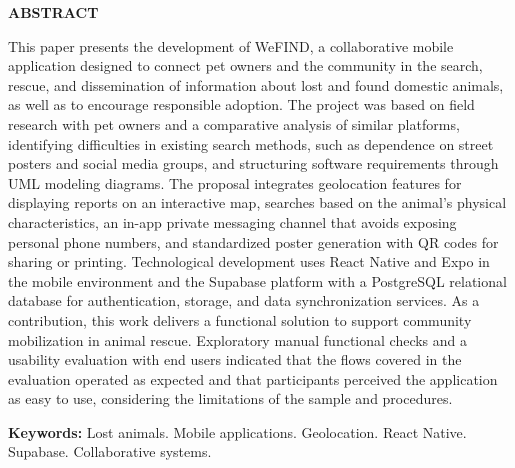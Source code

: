 \thispagestyle{empty}

\begin{center}
    \textbf{\large ABSTRACT}
\end{center}

\vspace{14pt}

\begin{singlespace}
\noindent\justifying
This paper presents the development of WeFIND, a collaborative mobile application designed to connect pet owners and the community in the search, rescue, and dissemination of information about lost and found domestic animals, as well as to encourage responsible adoption. The project was based on field research with pet owners and a comparative analysis of similar platforms, identifying difficulties in existing search methods, such as dependence on street posters and social media groups, and structuring software requirements through UML modeling diagrams. The proposal integrates geolocation features for displaying reports on an interactive map, searches based on the animal's physical characteristics, an in-app private messaging channel that avoids exposing personal phone numbers, and standardized poster generation with QR codes for sharing or printing. Technological development uses React Native and Expo in the mobile environment and the Supabase platform with a PostgreSQL relational database for authentication, storage, and data synchronization services. As a contribution, this work delivers a functional solution to support community mobilization in animal rescue. Exploratory manual functional checks and a usability evaluation with end users indicated that the flows covered in the evaluation operated as expected and that participants perceived the application as easy to use, considering the limitations of the sample and procedures.

\vspace{18pt}

\noindent
\textbf{Keywords:} Lost animals. Mobile applications. Geolocation. React Native. Supabase. Collaborative systems.
\end{singlespace}

\clearpage

